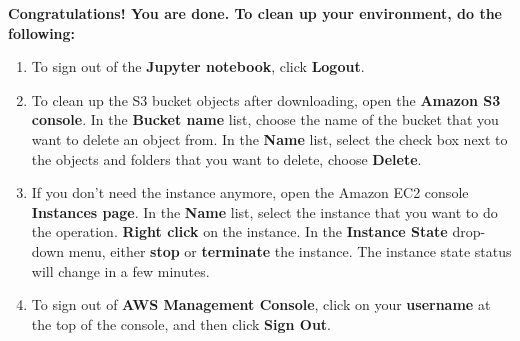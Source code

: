 \documentclass[]{book}
\providecommand{\tightlist}{%
  \setlength{\itemsep}{0pt}\setlength{\parskip}{0pt}}
\begin{document}
\textbf{Congratulations! You are done. To clean up your environment, do the following:}

\begin{enumerate}
\def\labelenumi{\arabic{enumi}.}
\setcounter{enumi}{115}
\tightlist
\item
  To sign out of the \textbf{Jupyter notebook}, click \textbf{Logout}.
\item
  To clean up the S3 bucket objects after downloading, open the \textbf{Amazon S3 console}. In the \textbf{Bucket name} list, choose the name of the bucket that you want to delete an object from. In the \textbf{Name} list, select the check box next to the objects and folders that you want to delete, choose \textbf{Delete}.
\item
  If you don't need the instance anymore, open the Amazon EC2 console \textbf{Instances page}. In the \textbf{Name} list, select the instance that you want to do the operation. \textbf{Right click} on the instance. In the \textbf{Instance State} drop-down menu, either \textbf{stop} or \textbf{terminate} the instance. The instance state status will change in a few minutes.
\item
  To sign out of \textbf{AWS Management Console}, click on your \textbf{username} at the top of the console, and then click \textbf{Sign Out}.
\end{enumerate}
\end{document}
